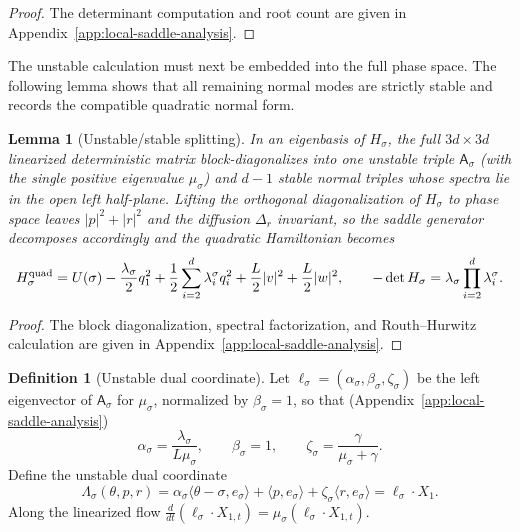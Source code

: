 \documentclass[11pt]{article}
\numberwithin{equation}{section}
\theoremstyle{plain}
\newtheorem{lemma}[theorem]{Lemma}
\theoremstyle{definition}
\newtheorem{definition}[theorem]{Definition}
\theoremstyle{remark}
\begin{document}
\begin{proof}
The determinant computation and root count are given in
Appendix~\ref{app:local-saddle-analysis}.
\end{proof}

The unstable calculation must next be embedded into the full
phase space.  The following lemma shows that all remaining normal modes are
strictly stable and records the compatible quadratic normal form.

\begin{lemma}[Unstable/stable splitting]
\label{lem:full-saddle-spectrum}
In an eigenbasis of $H_\sigma$, the full $3d\times3d$ linearized deterministic
matrix block-diagonalizes into one unstable triple $\mathsf A_\sigma$ (with
the single positive eigenvalue $\mu_\sigma$) and $d-1$ stable normal triples
whose spectra lie in the open left half-plane.  Lifting the orthogonal
diagonalization of $H_\sigma$ to phase space leaves
$|p|^2+|r|^2$ and the diffusion $\Delta_r$ invariant, so the saddle generator
decomposes accordingly and the quadratic Hamiltonian becomes
\begin{equation}
\label{eq:saddle-quadratic-Hamiltonian}
H_\sigma^{\rm quad}
=
U(\sigma)-\frac{\lambda_\sigma}{2}q_1^2
+\frac12\sum_{i=2}^d\lambda_i^\sigma q_i^2
+\frac L2|v|^2+\frac L2|w|^2 ,
\qquad
-\det H_\sigma=\lambda_\sigma\prod_{i=2}^d\lambda_i^\sigma .
\end{equation}
\end{lemma}

\begin{proof}
The block diagonalization, spectral factorization, and Routh--Hurwitz
calculation are given in Appendix~\ref{app:local-saddle-analysis}.
\end{proof}

\begin{definition}[Unstable dual coordinate]
\label{def:linear-saddle-coordinate}
Let $\ell_\sigma=(\alpha_\sigma,\beta_\sigma,\zeta_\sigma)$ be the left
eigenvector of $\mathsf A_\sigma$ for $\mu_\sigma$, normalized by
$\beta_\sigma=1$, so that (Appendix~\ref{app:local-saddle-analysis})
\[
\alpha_\sigma=\frac{\lambda_\sigma}{L\mu_\sigma},\qquad
\beta_\sigma=1,\qquad
\zeta_\sigma=\frac{\gamma}{\mu_\sigma+\gamma}.
\]
Define the unstable dual coordinate
\[
\Lambda_\sigma(\theta,p,r)
=
\alpha_\sigma\langle\theta-\sigma,e_\sigma\rangle
+\langle p,e_\sigma\rangle
+\zeta_\sigma\langle r,e_\sigma\rangle
=\ell_\sigma\cdot X_1 .
\]
Along the linearized flow
$\frac{d}{dt}(\ell_\sigma\cdot X_{1,t})
=\mu_\sigma(\ell_\sigma\cdot X_{1,t})$.
\end{definition}
\end{document}
